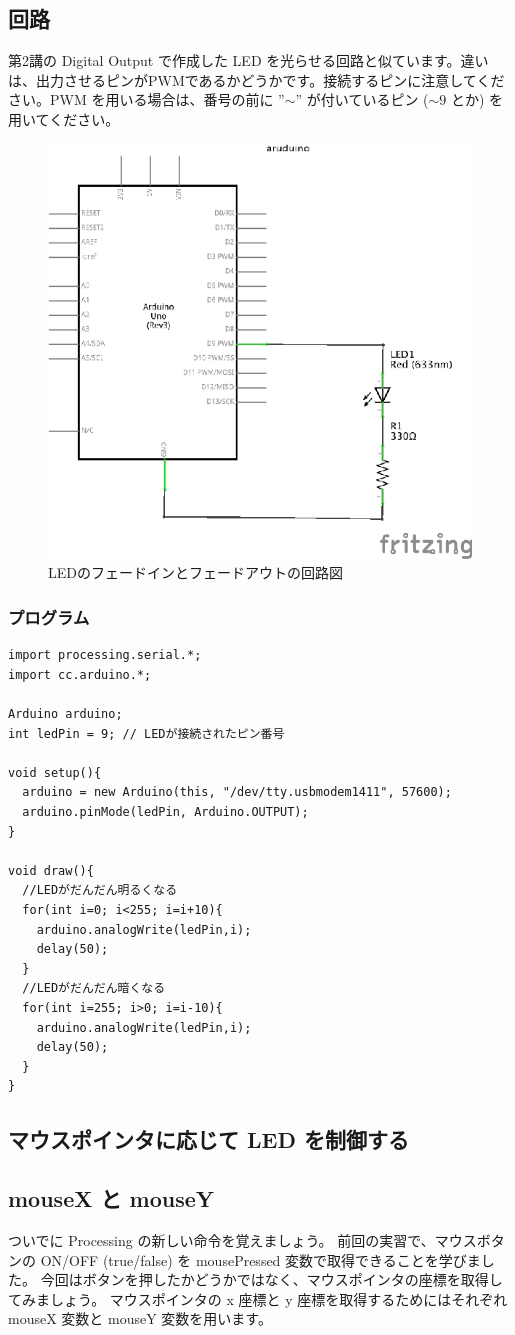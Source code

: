 \documentclass[11pt,a4paper]{jarticle}
\begin{document}
\subsection*{回路}
第2講の Digital Output で作成した LED を光らせる回路と似ています。違いは、出力させるピンがPWMであるかどうかです。接続するピンに注意してください。PWM を用いる場合は、番号の前に ''$\sim$'' が付いているピン ($\sim9$ とか) を用いてください。
\begin{figure}[h!]
 \centering
 \includegraphics[width=0.6\columnwidth]{img/LED_circuit.eps}
 \caption{LEDのフェードインとフェードアウトの回路図}
\end{figure}

\subsubsection*{プログラム}
\begin{lstlisting}
import processing.serial.*;
import cc.arduino.*;

Arduino arduino;
int ledPin = 9; // LEDが接続されたピン番号

void setup(){
  arduino = new Arduino(this, "/dev/tty.usbmodem1411", 57600);
  arduino.pinMode(ledPin, Arduino.OUTPUT);
}

void draw(){
  //LEDがだんだん明るくなる
  for(int i=0; i<255; i=i+10){
    arduino.analogWrite(ledPin,i);
    delay(50);
  }
  //LEDがだんだん暗くなる
  for(int i=255; i>0; i=i-10){
    arduino.analogWrite(ledPin,i);
    delay(50);
  }
}
\end{lstlisting}

\subsection{マウスポインタに応じて LED を制御する}
\subsection*{mouseX と mouseY}
ついでに Processing の新しい命令を覚えましょう。
前回の実習で、マウスボタンの ON/OFF (true/false) を mousePressed 変数で取得できることを学びました。
今回はボタンを押したかどうかではなく、マウスポインタの座標を取得してみましょう。
マウスポインタの x 座標と y 座標を取得するためにはそれぞれ mouseX 変数と mouseY 変数を用います。
\end{document}

